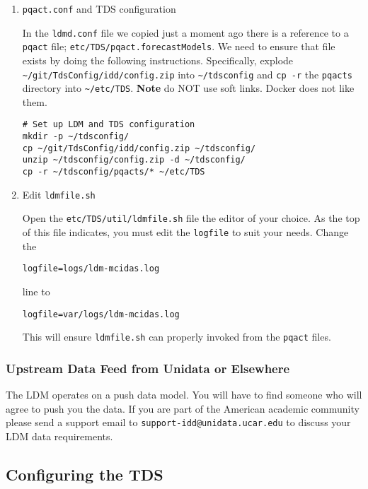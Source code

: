 \documentclass[11pt]{article}
\begin{document}
\begin{enumerate}
\item \texttt{pqact.conf} and TDS configuration
\label{sec:orgheadline20}

In the \texttt{ldmd.conf} file we copied just a moment ago there is a reference to a \texttt{pqact} file; \texttt{etc/TDS/pqact.forecastModels}. We need to ensure that file exists by doing the following instructions. Specifically, explode \texttt{\textasciitilde{}/git/TdsConfig/idd/config.zip} into \texttt{\textasciitilde{}/tdsconfig} and \texttt{cp -r} the \texttt{pqacts} directory into \texttt{\textasciitilde{}/etc/TDS}. \textbf{Note} do NOT use soft links. Docker does not like them.

\begin{verbatim}
# Set up LDM and TDS configuration
mkdir -p ~/tdsconfig/
cp ~/git/TdsConfig/idd/config.zip ~/tdsconfig/
unzip ~/tdsconfig/config.zip -d ~/tdsconfig/
cp -r ~/tdsconfig/pqacts/* ~/etc/TDS
\end{verbatim}

\item Edit \texttt{ldmfile.sh}
\label{sec:orgheadline21}

Open the \texttt{etc/TDS/util/ldmfile.sh} file the editor of your choice. As the top of this file indicates, you must edit the \texttt{logfile} to suit your needs. Change the 

\begin{verbatim}
logfile=logs/ldm-mcidas.log
\end{verbatim}

line to

\begin{verbatim}
logfile=var/logs/ldm-mcidas.log
\end{verbatim}

This will ensure \texttt{ldmfile.sh} can properly invoked from the \texttt{pqact} files.
\end{enumerate}

\subsubsection{Upstream Data Feed from Unidata or Elsewhere}
\label{sec:orgheadline23}

The LDM operates on a push data model. You will have to find someone who will agree to push you the data. If you are part of the American academic community please send a support email to \texttt{support-idd@unidata.ucar.edu} to discuss your LDM data requirements.

\subsection{Configuring the TDS}
\label{sec:orgheadline26}
\end{document}
